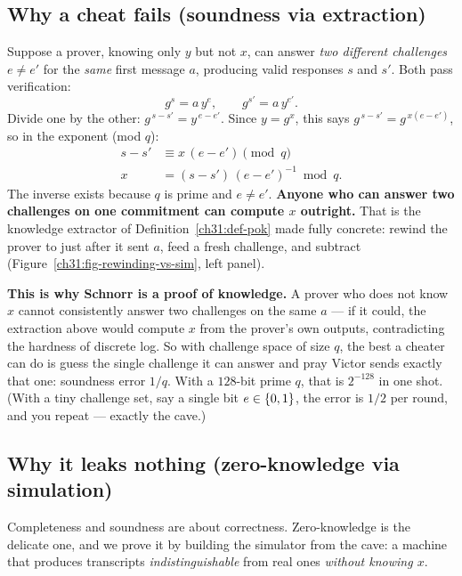 \subsection*{Why a cheat fails (soundness via extraction)}

Suppose a prover, knowing only $y$ but not $x$,
can answer \emph{two different challenges} $e \ne e'$ for the \emph{same}
first message $a$, producing valid responses $s$ and $s'$. Both pass
verification:
\[
  g^{s} = a\, y^{e}, \qquad g^{s'} = a\, y^{e'}.
\]
Divide one by the other: $g^{\,s - s'} = y^{\,e - e'}$. Since $y = g^{x}$, this
says $g^{\,s-s'} = g^{\,x(e-e')}$, so in the exponent (mod $q$):
\begin{align*}
  s - s' &\equiv x\,(e - e') \pmod{q} \\
  x &= (s - s')\,(e - e')^{-1} \bmod q.
\end{align*}
The inverse exists because $q$ is prime and $e \ne e'$. \textbf{Anyone who can
answer two challenges on one commitment can compute $x$ outright.} That is the
knowledge extractor of Definition~\ref{ch31:def-pok} made fully concrete: rewind
the prover to just after it sent $a$, feed a fresh challenge, and subtract (Figure~\ref{ch31:fig-rewinding-vs-sim}, left panel).

\begin{whybox}
\textbf{This is why Schnorr is a proof of knowledge.} A prover who does not know
$x$ cannot consistently answer two challenges on the same $a$ --- if it could, the
extraction above would compute $x$ from the prover's own outputs, contradicting
the hardness of discrete log. So with challenge space of size $q$, the best a
cheater can do is guess the single challenge it can answer and pray Victor sends
exactly that one: soundness error $1/q$. With a $128$-bit prime $q$, that is
$2^{-128}$ in one shot. (With a tiny challenge set, say a single bit
$e\in\{0,1\}$, the error is $1/2$ per round, and you repeat --- exactly the
cave.)
\end{whybox}

\subsection*{Why it leaks nothing (zero-knowledge via simulation)}

Completeness and soundness are about correctness. Zero-knowledge is the
delicate one, and we prove it by building the simulator from the cave: a machine
that produces transcripts \emph{indistinguishable} from real ones \emph{without
knowing $x$}.

